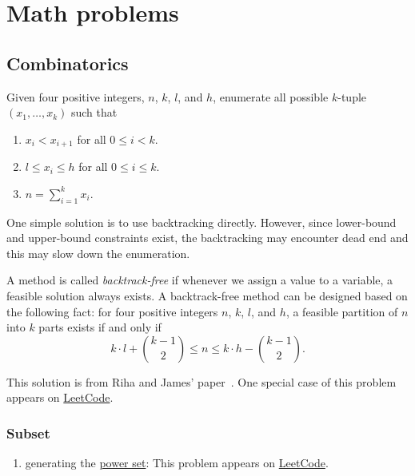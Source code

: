 \chapter{Math problems}

\section{Combinatorics}
\begin{Exercise}
Given four positive integers, $n$, $k$, $l$, and $h$, enumerate all possible $k$-tuple $(x_1, \dots, x_k)$ such that 
\begin{enumerate}
\item $x_i < x_{i + 1}$ for all $0 \leq i < k$.
\item $l \leq x_i \leq h$ for all $0 \leq i \leq k$.
\item $n = \sum_{i=1}^k x_i$.
\end{enumerate}
\end{Exercise}
\begin{Answer}
One simple solution is to use backtracking directly. 
However, since lower-bound and upper-bound constraints exist, the backtracking may encounter dead end and this may slow down the enumeration.

A method is called \emph{backtrack-free} if whenever we assign a value to a variable, a feasible solution always exists.
A backtrack-free method can be designed based on the following fact: for four positive integers $n$, $k$, $l$, and $h$, a feasible partition of $n$ into $k$ parts exists if and only if 
\[ k \cdot l + {{k-1}\choose{2}} \leq n \leq k \cdot h - {{k-1}\choose{2}}. \]
\begin{remark}
This solution is from Riha and James' paper~\cite{Riha1976}. One special case of this problem appears on \href{https://leetcode.com/problems/combination-sum-iii/}{LeetCode}.
\end{remark}
\end{Answer}

\subsection{Subset}
\begin{enumerate}
\item generating the \href{https://en.wikipedia.org/wiki/Power_set}{power set}: This problem appears on \href{https://leetcode.com/problems/subsets/}{LeetCode}.
\end{enumerate}

